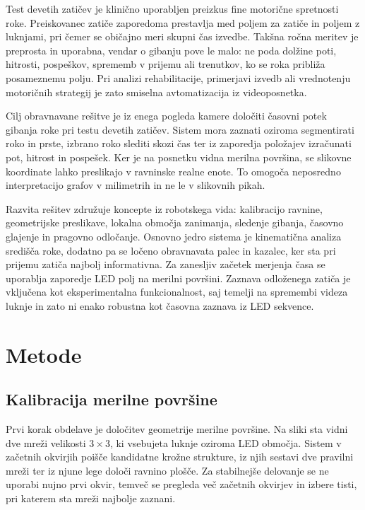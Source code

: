 \documentclass[journal,a4paper,twoside]{sty/IEEEtran}
\begin{document}
Test devetih zatičev je klinično uporabljen preizkus fine motorične spretnosti roke. Preiskovanec zatiče zaporedoma prestavlja med poljem za zatiče in poljem z luknjami, pri čemer se običajno meri skupni čas izvedbe. Takšna ročna meritev je preprosta in uporabna, vendar o gibanju pove le malo: ne poda dolžine poti, hitrosti, pospeškov, sprememb v prijemu ali trenutkov, ko se roka približa posameznemu polju. Pri analizi rehabilitacije, primerjavi izvedb ali vrednotenju motoričnih strategij je zato smiselna avtomatizacija iz videoposnetka.

Cilj obravnavane rešitve je iz enega pogleda kamere določiti časovni potek gibanja roke pri testu devetih zatičev. Sistem mora zaznati oziroma segmentirati roko in prste, izbrano roko slediti skozi čas ter iz zaporedja položajev izračunati pot, hitrost in pospešek. Ker je na posnetku vidna merilna površina, se slikovne koordinate lahko preslikajo v ravninske realne enote. To omogoča neposredno interpretacijo grafov v milimetrih in ne le v slikovnih pikah.

Razvita rešitev združuje koncepte iz robotskega vida: kalibracijo ravnine, geometrijske preslikave, lokalna območja zanimanja, sledenje gibanja, časovno glajenje in pragovno odločanje. Osnovno jedro sistema je kinematična analiza središča roke, dodatno pa se ločeno obravnavata palec in kazalec, ker sta pri prijemu zatiča najbolj informativna. Za zanesljiv začetek merjenja časa se uporablja zaporedje LED polj na merilni površini. Zaznava odloženega zatiča je vključena kot eksperimentalna funkcionalnost, saj temelji na spremembi videza luknje in zato ni enako robustna kot časovna zaznava iz LED sekvence.

\section{Metode}

\subsection{Kalibracija merilne površine}

Prvi korak obdelave je določitev geometrije merilne površine. Na sliki sta vidni dve mreži velikosti $3 \times 3$, ki vsebujeta luknje oziroma LED območja. Sistem v začetnih okvirjih poišče kandidatne krožne strukture, iz njih sestavi dve pravilni mreži ter iz njune lege določi ravnino plošče. Za stabilnejše delovanje se ne uporabi nujno prvi okvir, temveč se pregleda več začetnih okvirjev in izbere tisti, pri katerem sta mreži najbolje zaznani.
\end{document}
